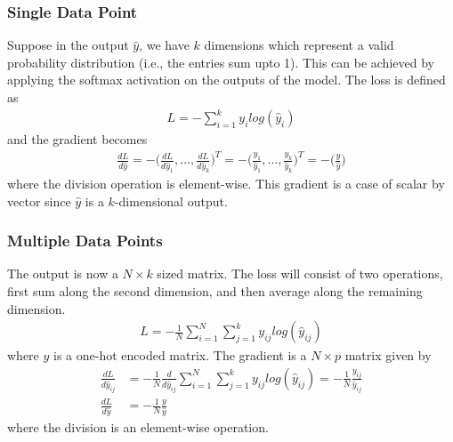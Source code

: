 \documentclass[../../deep_learning_notes.tex]{subfiles}
\begin{document}
\subsubsection*{Single Data Point}
Suppose in the output $\hat{y}$, we have $k$ dimensions which represent a valid probability distribution (i.e., the entries sum upto 1). This can be achieved by applying the softmax activation on the outputs of the model. The loss is defined as
\begin{align*}
    L = -\sum_{i=1}^{k}y_{i}log(\hat{y}_{i})
\end{align*}
and the gradient becomes
\begin{align*}
    \frac{dL}{d\hat{y}} = -\bigg(\frac{dL}{d\hat{y}_{1}}, \ldots, \frac{dL}{d\hat{y}_{k}} \bigg)^{T}
    =-\bigg(\frac{y_{1}}{\hat{y}_{1}}, \ldots, \frac{y_{k}}{\hat{y}_{k}} \bigg)^{T}
    = -\bigg(\frac{y}{\hat{y}} \bigg)
\end{align*}
where the division operation is element-wise. This gradient is a case of scalar by vector since $\hat{y}$ is a $k$-dimensional output.


\subsubsection*{Multiple Data Points}
The output is now a $N \times k$ sized matrix. The loss will consist of two operations, first sum along the second dimension, and then average along the remaining dimension.
\begin{align*}
    L = -\frac{1}{N} \sum_{i=1}^{N} \sum_{j=1}^{k} y_{ij}log(\hat{y}_{ij})
\end{align*}
where $y$ is a one-hot encoded matrix. The gradient is a $N \times p$ matrix given by
\begin{align*}
    \frac{dL}{d\hat{y}_{ij}} &= -\frac{1}{N} \frac{d}{d\hat{y}_{ij}} \sum_{i=1}^{N} \sum_{j=1}^{k} y_{ij}log(\hat{y}_{ij}) 
    = -\frac{1}{N} \frac{y_{ij}}{\hat{y}_{ij}}\\
    \frac{dL}{d\hat{y}} &= -\frac{1}{N} \frac{y}{\hat{y}}
\end{align*}
where the division is an element-wise operation.
\end{document}
